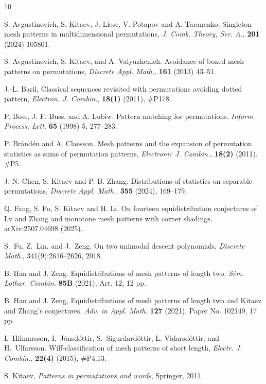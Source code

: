 \documentclass[12pt]{article}
\begin{document}
\begin{thebibliography}{10}


	 S. Avgustinovich, S. Kitaev, J. Liese, V. Potapov and A. Taranenko. Singleton mesh patterns in multidimensional permutations, {\em J. Comb. Theory, Ser. A.}, {\bf201} (2024) 105801.

	 S. Avgustinovich, S. Kitaev, and A. Valyuzhenich. Avoidance of boxed mesh patterns on permutations, {\em Discrete Appl. Math.}, {\bf 161} (2013) 43--51.

J.-L. Baril,  Classical sequences revisited with permutations avoiding dotted pattern,  {\em Electron. J. Combin.}, {\bf 18(1)} (2011), \#P178. 

 P. Bose, J. F. Buss, and A. Lubiw. Pattern matching for permutations. {\em Inform. Process. Lett.} {\bf 65} (1998) 5, 277--283.

 P. Br\"and\'en and A. Claesson. Mesh patterns and the expansion of permutation statistics as sums of permutation patterns, {\em Electronic J. Combin.}, {\bf 18(2)} (2011), \#P5. 

     J. N. Chen, S. Kitaev and P. B. Zhang. Distributions of statistics on separable permutations, {\em Discrete Appl. Math.}, {\bf 355} (2024), 169--179.
    
     Q. Fang, S. Fu, S. Kitaev and H. Li. On fourteen equidistribution conjectures of Lv and Zhang and monotone mesh patterns with corner shadings, arXiv:2507.04698 (2025).
    
  S.~Fu, Z.~Lin, and J.~Zeng. On two unimodal descent polynomials, {\em Discrete Math.}, 341(9):2616--2626, 2018.

 B. Han and J. Zeng. Equidistributions of mesh patterns of length two. {\em S\'{e}m. Lothar. Combin.} {\bf 85B} (2021), Art. 12, 12 pp. 

 B. Han and J. Zeng,  Equidistributions of mesh patterns of length two and Kitaev and Zhang's conjectures. {\em Adv. in Appl. Math.} {\bf 127} (2021), Paper No. 102149, 17 pp.

I.~Hilmarsson, I.~J\'onsd\'ottir, S.~Sigurdard\'ottir, L. Vidarsd\'ottir, and H.~Ulfarsson. Wilf-classification of mesh patterns of short length,
  {\em Electr. J. Combin.}, {\bf 22(4)} (2015),  \#P4.13.
	
 S. Kitaev, \emph{Patterns in permutations and words}, Springer, 2011.


\end{thebibliography}
\end{document}
